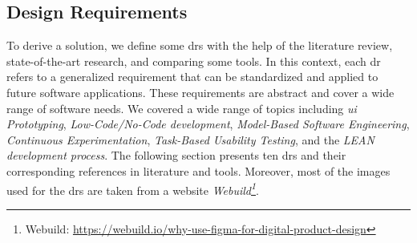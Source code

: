 \subsection{Design Requirements}
\label{design:section:designReqs}
To derive a solution, we define some \ac{dr}s with the help of the literature review, state-of-the-art research, and comparing some tools.
In this context, each \ac{dr} refers to a generalized requirement that can be standardized and applied to future software applications. 
These requirements are abstract and cover a wide range of software needs.
We covered a wide range of topics including \textit{\ac{ui} Prototyping}, \textit{Low-Code/No-Code development}, \textit{Model-Based Software Engineering}, \textit{Continuous Experimentation}, \textit{Task-Based Usability Testing}, and the \textit{LEAN development process}.
The following section presents ten \ac{dr}s and their corresponding references in literature and tools. 
Moreover, most of the images used for the \ac{dr}s are taken from a website \textit{Webuild\footnote{Webuild: \url{https://webuild.io/why-use-figma-for-digital-product-design}}}.

